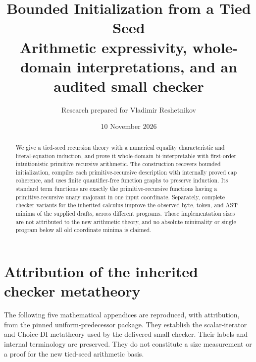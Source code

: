 \documentclass[11pt,letterpaper]{article}
\title{\color{ink}\bfseries Bounded Initialization from a Tied Seed\\[6pt]\large Arithmetic expressivity, whole-domain interpretations, and an audited small checker}
\author{Research prepared for Vladimir Reshetnikov}\date{10 November 2026}
\theoremstyle{definition}\newtheorem{definition}[theorem]{Definition}
\theoremstyle{remark}\newtheorem{remark}[theorem]{Remark}
\begin{document}
\maketitle
\begin{abstract}
We give a tied-seed recursion theory with a numerical equality characteristic and literal-equation induction, and prove it whole-domain bi-interpretable with first-order intuitionistic primitive recursive arithmetic. The construction recovers bounded initialization, compiles each primitive-recursive description with internally proved cap coherence, and uses finite quantifier-free function graphs to preserve induction. Its standard term functions are exactly the primitive-recursive functions having a primitive-recursive unary majorant in one input coordinate. Separately, complete checker variants for the inherited calculus improve the observed byte, token, and AST minima of the supplied drafts, across different programs. Those implementation sizes are not attributed to the new arithmetic theory, and no absolute minimality or single program below all old coordinate minima is claimed.
\end{abstract}

\clearpage\setcounter{tocdepth}{1}\tableofcontents\clearpage





\appendix

\section{Attribution of the inherited checker metatheory}
The following five mathematical appendices are reproduced, with attribution, from the pinned uniform-predecessor package. They establish the scalar-iterator and Choice-DI metatheory used by the delivered small checker. Their labels and internal terminology are preserved. They do not constitute a size measurement or a proof for the new tied-seed arithmetic basis.





\clearpage
\end{document}
